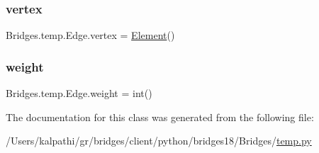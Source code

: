 \mbox{\label{class_bridges_1_1temp_1_1_edge_a34c83e7b1c4cde4ee443df0e2c1451a1}} 
\subsubsection{\texorpdfstring{vertex}{vertex}}
{\footnotesize\ttfamily Bridges.\+temp.\+Edge.\+vertex = \mbox{\hyperlink{class_bridges_1_1_element_1_1_element}{Element}}()\hspace{0.3cm}{\ttfamily [static]}}

\mbox{\label{class_bridges_1_1temp_1_1_edge_ad4176272c9d969f23adbeeb901e73615}} 
\subsubsection{\texorpdfstring{weight}{weight}}
{\footnotesize\ttfamily Bridges.\+temp.\+Edge.\+weight = int()\hspace{0.3cm}{\ttfamily [static]}}



The documentation for this class was generated from the following file\+:\begin{DoxyCompactItemize}
\item 
/\+Users/kalpathi/gr/bridges/client/python/bridges18/\+Bridges/\mbox{\hyperlink{temp_8py}{temp.\+py}}\end{DoxyCompactItemize}
